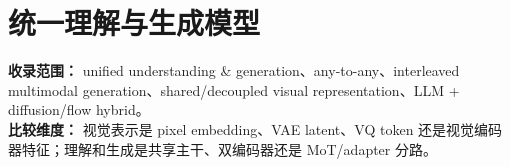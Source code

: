 
\section*{统一理解与生成模型}
{}

\begin{conceptbox}
\textbf{收录范围：} unified understanding \& generation、any-to-any、interleaved multimodal generation、shared/decoupled visual representation、LLM + diffusion/flow hybrid。\\
\textbf{比较维度：} 视觉表示是 pixel embedding、VAE latent、VQ token 还是视觉编码器特征；理解和生成是共享主干、双编码器还是 MoT/adapter 分路。
\end{conceptbox}



